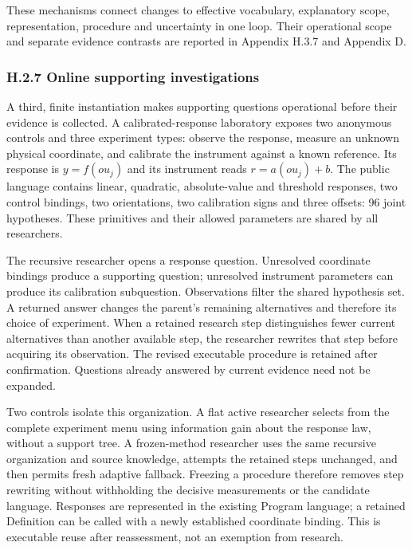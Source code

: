 \documentclass[11pt,a4paper]{article}
\begin{document}
These mechanisms connect changes to effective vocabulary, explanatory scope,
representation, procedure and uncertainty in one loop. Their operational scope
and separate evidence contrasts are reported in Appendix H.3.7 and Appendix D.


\subsubsection*{H.2.7 Online supporting investigations}

A third, finite instantiation makes supporting questions operational before
their evidence is collected. A calibrated-response laboratory exposes two
anonymous controls and three experiment types: observe the response, measure
an unknown physical coordinate, and calibrate the instrument against a known
reference. Its response is \(y=f(o u_j)\) and its instrument reads
\(r=a(o u_j)+b\). The public language contains linear, quadratic, absolute-value
and threshold responses, two control bindings, two orientations, two calibration
signs and three offsets: 96 joint hypotheses. These primitives and their allowed
parameters are shared by all researchers.


The recursive researcher opens a response question. Unresolved coordinate
bindings produce a supporting question; unresolved instrument parameters can
produce its calibration subquestion. Observations filter the shared hypothesis
set. A returned answer changes the parent's remaining alternatives and therefore
its choice of experiment. When a retained research step distinguishes fewer
current alternatives than another available step, the researcher rewrites that
step before acquiring its observation. The revised executable procedure is
retained after confirmation. Questions already answered by current evidence need
not be expanded.


Two controls isolate this organization. A flat active researcher selects from
the complete experiment menu using information gain about the response law,
without a support tree. A frozen-method researcher uses the same recursive
organization and source knowledge, attempts the retained steps unchanged, and
then permits fresh adaptive fallback. Freezing a procedure therefore removes
step rewriting without withholding the decisive measurements or the candidate
language. Responses are represented in the existing Program language; a
retained Definition can be called with a newly established coordinate binding.
This is executable reuse after reassessment, not an exemption from research.
\end{document}
